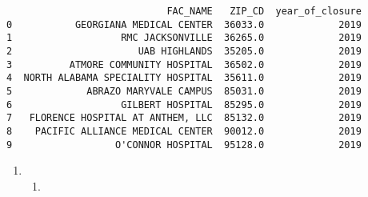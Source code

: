 \documentclass[
  letterpaper,
  DIV=11,
  numbers=noendperiod]{scrartcl}
\providecommand{\tightlist}{%
  \setlength{\itemsep}{0pt}\setlength{\parskip}{0pt}}\usepackage{longtable,booktabs,array}
\begin{document}
\begin{verbatim}
                            FAC_NAME   ZIP_CD  year_of_closure
0           GEORGIANA MEDICAL CENTER  36033.0             2019
1                   RMC JACKSONVILLE  36265.0             2019
2                      UAB HIGHLANDS  35205.0             2019
3          ATMORE COMMUNITY HOSPITAL  36502.0             2019
4  NORTH ALABAMA SPECIALITY HOSPITAL  35611.0             2019
5             ABRAZO MARYVALE CAMPUS  85031.0             2019
6                   GILBERT HOSPITAL  85295.0             2019
7   FLORENCE HOSPITAL AT ANTHEM, LLC  85132.0             2019
8    PACIFIC ALLIANCE MEDICAL CENTER  90012.0             2019
9                  O'CONNOR HOSPITAL  95128.0             2019
\end{verbatim}

\begin{enumerate}
\def\labelenumi{\arabic{enumi}.}
\setcounter{enumi}{2}
\tightlist
\item
  \begin{enumerate}
  \def\labelenumii{\alph{enumii}.}
  \tightlist
  \item
  \end{enumerate}
\end{enumerate}
\end{document}
